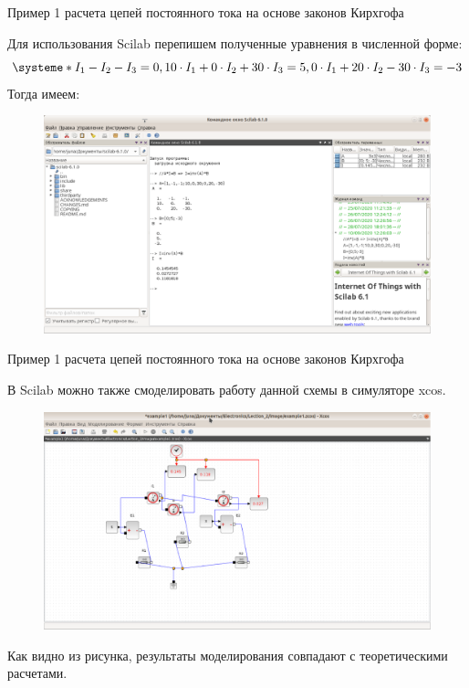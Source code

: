\documentclass[10pt, pdf, hyperref={unicode},handout]{beamer}
\begin{document}
\begin{frame}{Пример 1  расчета цепей постоянного тока на основе законов Кирхгофа}
  \begin{block}

    \small{

      Для использования Scilab перепишем полученные уравнения в численной форме:
\[
\systeme*{I_1-I_2-I_3=0, 10\cdot I_1+0\cdot I_2+30\cdot I_3=5, 0\cdot I_1+20\cdot I_2-30\cdot I_3=-3}
\]
Тогда имеем:
 \begin{figure}[htb] 
    \centering
    \includegraphics [scale=0.7]{ris8.eps}
  \end{figure}
      

}
  \end{block}
  
\end{frame}

\begin{frame}{Пример 1  расчета цепей постоянного тока на основе законов Кирхгофа}
  \begin{block}

    \small{

 В Scilab можно также смоделировать работу данной схемы в симуляторе xcos.
  \begin{figure}[htb] 
    \centering
    \includegraphics [scale=0.6]{ris9.eps}
  \end{figure}     
Как видно из рисунка, результаты моделирования совпадают с теоретическими расчетами.
}
  \end{block}
  
\end{frame}
\end{document}
